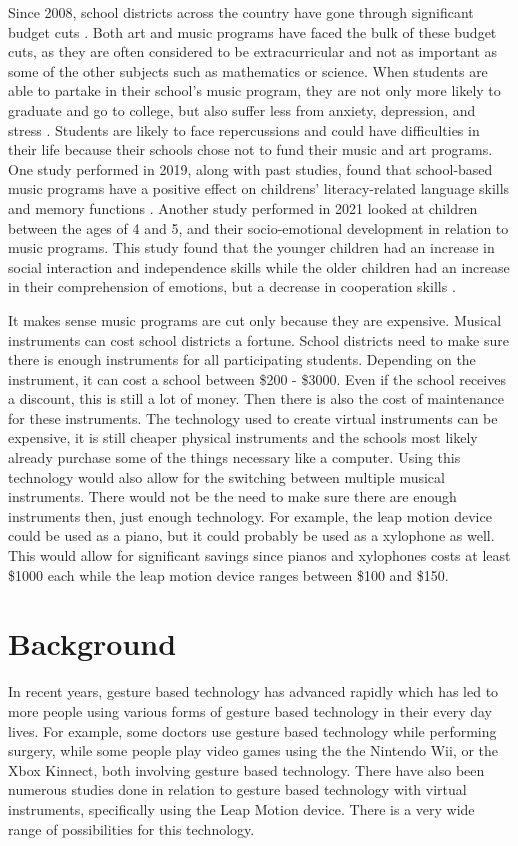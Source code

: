 \documentclass[sigconf,authordraft]{acmart}
\begin{document}
Since 2008, school districts across the country have gone through significant budget cuts \cite{mcdonald_2016}.  Both art and music programs have faced the bulk of these budget cuts, as they are often considered to be extracurricular and not as important as some of the other subjects such as mathematics or science.  When students are able to partake in their school’s music program, they are not only more likely to graduate and go to college, but also suffer less from anxiety, depression, and stress \cite{vinnard22, mcdonald_2016}.  Students are likely to face repercussions and could have difficulties in their life because their schools chose not to fund their music and art programs.  One study performed in 2019, along with past studies, found that school-based music programs have a positive effect on childrens’ literacy-related language skills and memory functions \cite{Lukas}.  Another study performed in 2021 looked at children between the ages of 4 and 5, and their socio-emotional development in relation to music programs.  This study found that the younger children had an increase in social interaction and independence skills while the older children had an increase in their comprehension of emotions, but a decrease in cooperation skills \cite{Boucher}.

It makes sense music programs are cut only because they are expensive.  Musical instruments can cost school districts a fortune.  School districts need to make sure there is enough instruments for all participating students.  Depending on the instrument, it can cost a school between \$200 - \$3000.  Even if the school receives a discount, this is still a lot of money.  Then there is also the cost of maintenance for these instruments.  The technology used to create virtual instruments can be expensive, it is still cheaper physical instruments and the schools most likely already purchase some of the things necessary like a computer.  Using this technology would also allow for the switching between multiple musical instruments.  There would not be the need to make sure there are enough instruments then, just enough technology.  For example, the leap motion device could be used as a piano, but it could probably be used as a xylophone as well.  This would allow for significant savings since pianos and xylophones costs at least \$1000 each while the leap motion device ranges between \$100 and \$150.


\section{Background}
In recent years, gesture based technology has advanced rapidly which has led to more people using various forms of gesture based technology in their every day lives.  For example, some doctors use gesture based technology while performing surgery, while some people play video games using the the Nintendo Wii, or the Xbox Kinnect, both involving gesture based technology.  There have also been numerous studies done in relation to gesture based technology with virtual instruments, specifically using the Leap Motion device.  There is a very wide range of possibilities for this technology.
\end{document}
